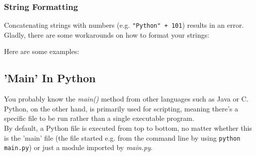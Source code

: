         \subsubsection{String Formatting}
        Concatenating strings with numbers (e.g. \texttt{"Python" + 101}) results in an
        error. \\
        Gladly, there are some workarounds on how to format your strings:



        Here are some examples:


    \subsection{'Main' In Python}
        You probably know the \textit{main()} method from other languages such as Java or C. \\
        Python, on the other hand, is primarily used for scripting, meaning there's a specific file
        to be run rather than a single executable program. \\
        By default, a Python file is executed from top to bottom, no matter whether this is the
        'main' file (the file started e.g. from the command line by using
        \texttt{python main.py}) or just a module imported by \textit{main.py}.

